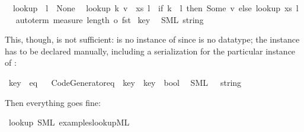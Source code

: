 \begin{isabellebody}
\ \ {\isachardoublequoteopen}lookup\ {\isacharbrackleft}{\isacharbrackright}\ l\ {\isacharequal}\ None{\isachardoublequoteclose}\isanewline
\ \ {\isachardoublequoteopen}lookup\ {\isacharparenleft}{\isacharparenleft}k{\isacharcomma}\ v{\isacharparenright}\ {\isacharhash}\ xs{\isacharparenright}\ l\ {\isacharequal}\ {\isacharparenleft}if\ k\ {\isacharequal}\ l\ then\ Some\ v\ else\ lookup\ xs\ l{\isacharparenright}{\isachardoublequoteclose}\isanewline
{}\isamarkupfalse%
%
\isadelimproof
\ %
\endisadelimproof
%
\isatagproof
{}\isamarkupfalse%
\ {\isacharparenleft}auto{\isacharunderscore}term\ {\isachardoublequoteopen}measure\ {\isacharparenleft}length\ o\ fst{\isacharparenright}{\isachardoublequoteclose}{\isacharparenright}%
\endisatagproof
{\isafoldproof}%
%
\isadelimproof
%
\endisadelimproof
\isanewline
{}\isamarkupfalse%
\ key\isanewline
\ \ {\isacharparenleft}SML\ {\isachardoublequoteopen}string{\isachardoublequoteclose}{\isacharparenright}%
\begin{isamarkuptext}%
This, though, is not sufficient:  is no instance
  of  since  is no datatype; the instance
  has to be declared manually, including a serialization
  for the particular instance of :%
\end{isamarkuptext}%
\isamarkuptrue%
\isamarkupfalse%
\ key\ {\isacharcolon}{\isacharcolon}\ eq%
\isadelimproof
\ %
\endisadelimproof
%
\isatagproof
\isacommand{{\isachardot}{\isachardot}}\isamarkupfalse%
%
\endisatagproof
{\isafoldproof}%
%
\isadelimproof
%
\endisadelimproof
\isanewline
\isanewline
{}\isamarkupfalse%
\ {\isachardoublequoteopen}Code{\isacharunderscore}Generator{\isachardot}eq\ {\isasymColon}\ key\ {\isasymRightarrow}\ key\ {\isasymRightarrow}\ bool{\isachardoublequoteclose}\isanewline
\ \ {\isacharparenleft}SML\ {\isachardoublequoteopen}{\isacharbang}{\isacharparenleft}{\isacharunderscore}\ {\isacharcolon}\ string\ {\isacharequal}\ {\isacharunderscore}{\isacharparenright}{\isachardoublequoteclose}{\isacharparenright}%
\begin{isamarkuptext}%
Then everything goes fine:%
\end{isamarkuptext}%
\isamarkuptrue%
\isamarkupfalse%
\ lookup\ {\isacharparenleft}SML\ {\isachardoublequoteopen}examples{\isacharslash}lookup{\isachardot}ML{\isachardoublequoteclose}{\isacharparenright}%
\begin{isamarkuptext}%

\end{isamarkuptext}
\end{isabellebody}
